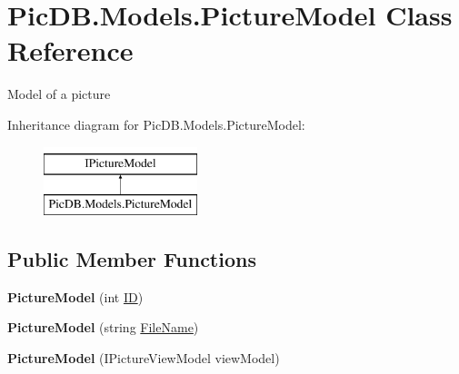 \hypertarget{class_pic_d_b_1_1_models_1_1_picture_model}{}\section{Pic\+D\+B.\+Models.\+Picture\+Model Class Reference}
\label{class_pic_d_b_1_1_models_1_1_picture_model}


Model of a picture  


Inheritance diagram for Pic\+D\+B.\+Models.\+Picture\+Model\+:\begin{figure}[H]
\begin{center}
\leavevmode
\includegraphics[height=2.000000cm]{class_pic_d_b_1_1_models_1_1_picture_model}
\end{center}
\end{figure}
\subsection*{Public Member Functions}
\begin{DoxyCompactItemize}
\item 
\mbox{\label{class_pic_d_b_1_1_models_1_1_picture_model_a8f01ad2337a54ebc415871ae1941f596}} 
{\bfseries Picture\+Model} (int \mbox{\hyperlink{class_pic_d_b_1_1_models_1_1_picture_model_a534920b39400aed29cff8e46d16f0643}{ID}})
\item 
\mbox{\label{class_pic_d_b_1_1_models_1_1_picture_model_a3145355a21104b18f9db82d3ca7dd80d}} 
{\bfseries Picture\+Model} (string \mbox{\hyperlink{class_pic_d_b_1_1_models_1_1_picture_model_a1d64b84ae4e891844d1c2314f4addb62}{File\+Name}})
\item 
\mbox{\label{class_pic_d_b_1_1_models_1_1_picture_model_a76f679543ac71baf433c9eba41166604}} 
{\bfseries Picture\+Model} (I\+Picture\+View\+Model view\+Model)
\end{DoxyCompactItemize}
